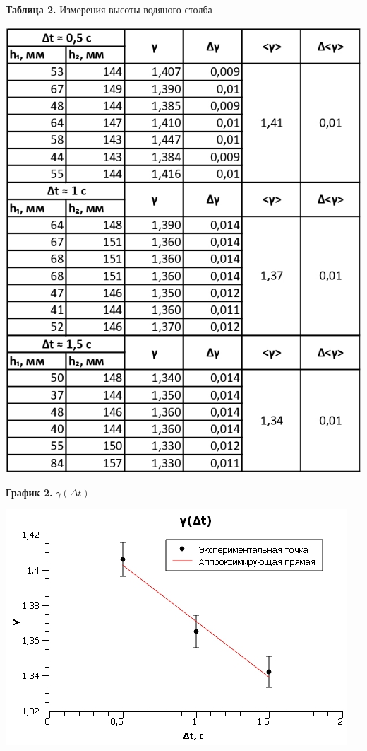 \documentclass[15pt,a5paper,reqno]{article}
\begin{document}
    \newpage
    \noindent\textbf{Таблица 2.} Измерения высоты водяного столба\\
    \begin{center}
        \includegraphics[]{Таблица 2.jpg}
    \end{center}
    
    \newpage
    \noindent\textbf{График 2.} $\gamma(\Delta t)$\\
    \begin{center}
        \includegraphics[]{График 2.jpg}
    \end{center}
\end{document}
